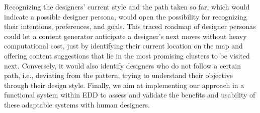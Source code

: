 

Recognizing the designers' current style and the path taken so far, which would indicate a possible designer persona, would open the possibility for recognizing their intentions, preferences, and goals. This traced roadmap of designer personas could let a content generator anticipate a designer's next moves without heavy computational cost, just by identifying their current location on the map and offering content suggestions that lie in the most promising clusters to be visited next. Conversely, it would also identify designers who do not follow a certain path, i.e., deviating from the pattern, trying to understand their objective through their design style. Finally, we aim at implementing our approach in a functional system within EDD to assess and validate the benefits and usability of these adaptable systems with human designers.





